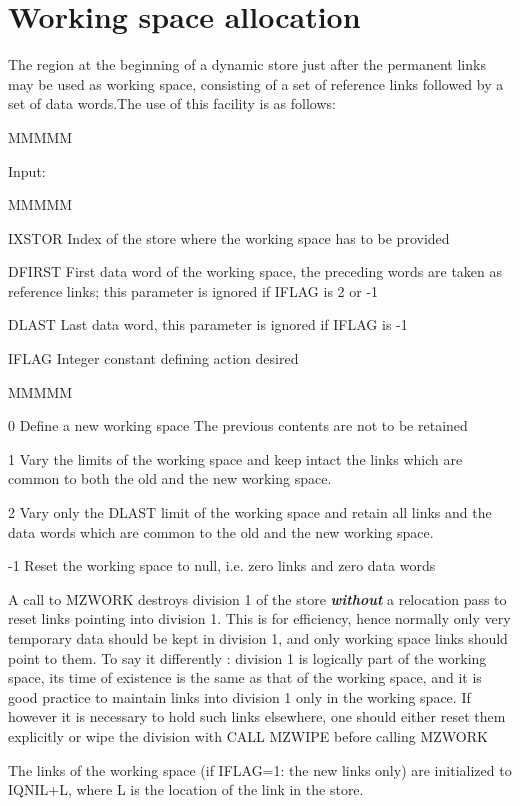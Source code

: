 \section{Working space allocation}
\par The region at the beginning of a dynamic store just after
the permanent links may be used as working space,
consisting of a set of reference links followed by
a set of data words.The use of this facility is as follows:
\begin{DL}{MMMMM}
\item[Input:
]
\begin{DL}{MMMMM}
\item[IXSTOR
]Index of the store where the working space has to be provided
\item[DFIRST
]First data word of the working space,
the preceding words are taken as reference links;
this parameter is ignored if IFLAG is 2 or -1
\item[DLAST
]Last data word,
this parameter is ignored if IFLAG is -1
\item[IFLAG
]Integer constant defining action desired
\begin{DL}{MMMMM}
\item[ 0
]Define a new working space
\newline The previous contents are not to be retained
\item[ 1
]Vary the limits of the working space and keep
intact the links which are common to
both the old and the new working space.
\item[ 2
]Vary only the DLAST limit of the working space and retain
all links and the data words
which are common to the old and the new working space.
\item[-1
]Reset the working space to null,
i.e. zero links and zero data words
\end{DL}
\end{DL}
\end{DL}
\par A call to MZWORK destroys division 1 of the store
{\bf\it without}
a relocation pass to reset links pointing into division 1.
This is for efficiency,
hence normally only very temporary data should be kept in division 1,
and only working space links should point to them.
To say it differently : division 1 is logically part of the
working space,
its time of existence is the same as that of the working space,
and it is good practice to maintain links into division 1
only in the working space.
If however it is necessary to hold such links elsewhere,
one should either reset them explicitly or wipe the division with
CALL MZWIPE before calling MZWORK
\par The links of the working space (if IFLAG=1: the new links only)
are initialized to  IQNIL+L,
where L is the location of the link in the store.
